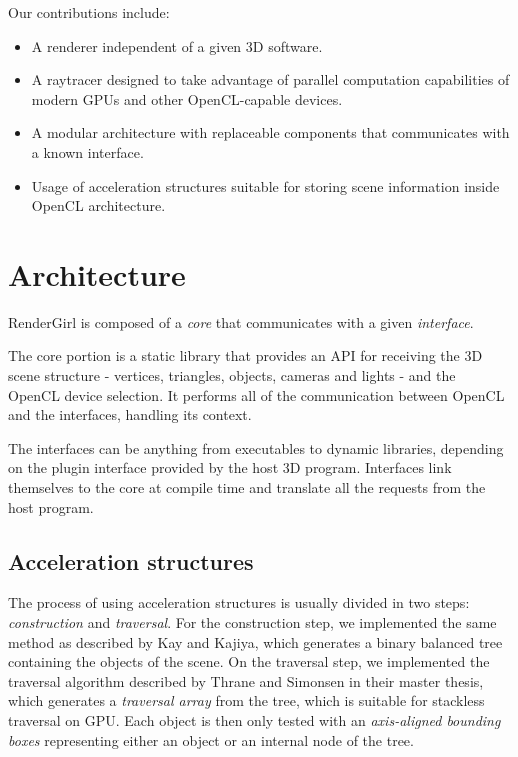 \documentclass[a0,portrait]{a0poster}
\begin{document}
\begin{multicols}{2}
Our contributions include:

\begin{itemize}
  \item A renderer independent of a given 3D software.
  \item A raytracer designed to take advantage of parallel
    computation capabilities of modern GPUs and other OpenCL-capable
    devices.
  \item A modular architecture with replaceable components that
    communicates with a known interface.
  \item Usage of acceleration structures suitable for storing scene
    information inside OpenCL architecture.
\end{itemize}


\section*{Architecture}

RenderGirl is composed of a \emph{core} that communicates with a given
\emph{interface}.

The core portion is a static library that provides an API for
receiving the 3D scene structure - vertices, triangles, objects,
cameras and lights - and the OpenCL device selection. It performs all
of the communication between OpenCL and the interfaces, handling its
context.

The interfaces can be anything from executables to dynamic libraries,
depending on the plugin interface provided by the host 3D
program. Interfaces link themselves to the core at compile time and
translate all the requests from the host program.

\subsection*{Acceleration structures}

The process of using acceleration structures is usually divided in two
steps: \emph{construction} and \emph{traversal}. For the construction
step, we implemented the same method as described by Kay and
Kajiya\cite{kay1986ray}, which generates a binary balanced tree
containing the objects of the scene. On the traversal step, we
implemented the traversal algorithm described by Thrane and Simonsen
in their master thesis\cite{Thrane}, which generates a \emph{traversal
  array} from the tree, which is suitable for stackless traversal on
GPU. Each object is then only tested with an \emph{axis-aligned
  bounding boxes} representing either an object or an internal node of
the tree.


\end{multicols}
\end{document}
